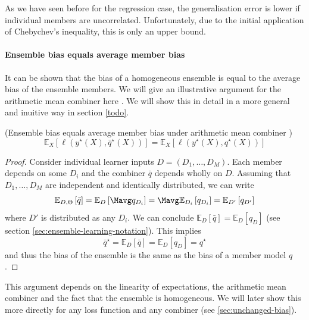 \documentclass[
    a4paper, %
	fontsize=10pt, %
	twoside=false, %
]{kaobook}
\begin{document}
As we have seen before for the regression case, the generalisation error is lower if individual members are uncorrelated. Unfortunately, due to the initial application of Chebychev's inequality, this is only an upper bound. 

\paragraph{Ensemble bias equals average member bias}
It can be shown that the bias of a homogeneous ensemble is equal to the average bias of the ensemble members. We will give an illustrative argument for the arithmetic mean combiner here
.
We will show this in detail in a more general and inuitive way in section \ref{todo}.

\begin{lemma} (Ensemble bias equals average member bias under arithmetic mean combiner \cite{louppe_UnderstandingRandomForests_2015})
  \label{thm:ensemble-bias-equals-average-bias}
$$
\mathbb{E}_{X}\left[ \ell(y^\star(X), \bar{q}^\star(X)) \right] 
= \mathbb{E}_{X}\left[ \ell(y^\star(X), q^\star(X)) \right] 
$$
\end{lemma}
\begin{proof}
Consider individual learner inputs $D = (D_{1}, \dots, D_{M})$. Each member depends on some $D_{i}$ and the combiner $\bar{q}$ depends wholly on $D$. Assuming that $D_{1}, \dots, D_{M}$ are independent and identically distributed, we can write
$$
\mathbb{E}_{D, \Theta}\left[ \bar{q} \right] = \mathbb{E}_{D}\left[ \Mavg q_{D_{i}} \right] = \Mavg \mathbb{E}_{D_{i}}\left[ q_{D_{i}} \right] = \mathbb{E}_{D'}\left[ q_{D'} \right]
$$
where $D'$ is distributed as any $D_{i}$. We can conclude $\mathbb{E}_{D}\left[ \bar{q} \right] = \mathbb{E}_{D}\left[ q_{D} \right]$ (see section \ref{sec:ensemble-learning-notation}).
This implies
$$
\bar{q}^\star = \mathbb{E}_{D}\left[ \bar{q} \right]  = \mathbb{E}_{D}\left[ q_{D} \right]  = q^\star
$$
and thus the bias of the ensemble is the same as the bias of a member model $q$.
\end{proof}
This argument depends on the linearity of expectations, the arithmetic mean combiner and the fact that the ensemble is homogeneous. We will later show this more directly for any loss function and any combiner (see \ref{sec:unchanged-bias}).
\end{document}
